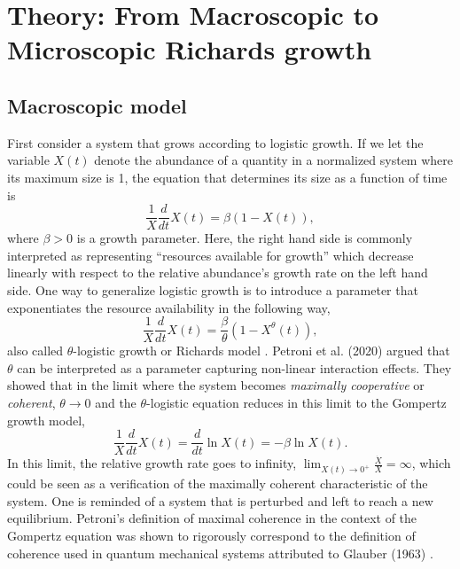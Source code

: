 \documentclass{article}
\begin{document}
\section{Theory: From Macroscopic to Microscopic Richards growth}
\subsection{Macroscopic model}
\label{sec:macro}

First consider a system that grows according to logistic growth. If we let the variable $X(t)$ denote the abundance of a quantity in a normalized system where its maximum size is 1, the equation that determines its size as a function of time is
\begin{equation}
  \label{eq:logistic}
  \frac{1}{X}\frac{d}{dt} X(t) = \beta (1 - X(t)),
\end{equation}
where $\beta>0$ is a growth parameter. Here, the right hand side is commonly interpreted as representing ``resources available for growth'' which decrease linearly with respect to the relative abundance's growth rate on the left hand side. One way to generalize logistic growth is to introduce a parameter that exponentiates the resource availability in the following way,
\begin{equation}
\label{eq:Rich}
  \frac{1}{X}\frac{d}{dt} X(t) = \frac{\beta}{\theta} (1 - X^{\theta}(t)),
\end{equation}
also called $\theta$-logistic growth or Richards model \citep{richards1959flexible}. Petroni et al. (2020) argued that $\theta$ can be interpreted as a parameter capturing non-linear interaction effects. They showed that in the limit where the system becomes \textit{maximally cooperative} or \textit{coherent}, $\theta\rightarrow 0$ and the $\theta$-logistic equation reduces in this limit to the Gompertz growth model,
 \begin{equation}
 \label{eq:Gomp}
  \frac{1}{X}\frac{d}{dt} X(t) = \frac{d}{dt}\ln{X}(t) = - \beta \ln X(t).
\end{equation}
In this limit, the relative growth rate goes to infinity, $\lim_{X(t)\to 0^{+}}\frac{\dot X}{X} = \infty$, which could be seen as a verification of the maximally coherent characteristic of the system. One is reminded of a system that is perturbed and left to reach a new equilibrium. Petroni's definition of maximal coherence in the context of the Gompertz equation was shown to rigorously correspond to the definition of coherence used in quantum mechanical systems \cite{molski2003coherent} attributed to Glauber (1963) \cite{glauber1963coherent}.
\end{document}
